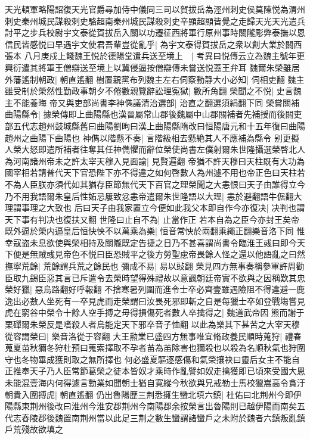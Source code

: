天光頓軍略陽詔復天光官爵尋加侍中儀同三司以賀拔岳為涇州刺史侯莫陳悦為渭州刺史秦州城民謀殺刺史駱超南秦州城民謀殺刺史辛顯超顯皆覺之走歸天光天光遣兵討平之步兵校尉宇文泰從賀拔岳入關以功遷征西將軍行原州事時關隴彫弊泰撫以恩信民皆感悦曰早遇宇文使君吾輩豈從亂乎|{
	為宇文泰得賀拔岳之衆以創大業於關西張本}
八月庚戍上餞魏王悦於德陽堂遣兵送至境上　|{
	考異曰悦傳云立為魏主號年更興衍遣其將軍王僧辯送至境上以冀侵逼按僧辯傳未嘗送悦蓋王弁耳}
魏爾朱榮雖居外藩遙制朝政|{
	朝直遙翻}
樹置親黨布列魏主左右伺察動静大小必知|{
	伺相吏翻}
魏主雖受制於榮然性勤政事朝夕不倦數親覽辭訟理寃獄|{
	數所角翻}
榮聞之不悦|{
	史言魏主不能養晦}
帝又與吏部尚書李神儁議清治選部|{
	治直之翻選須絹翻下同}
榮嘗關補曲陽縣令|{
	據榮傳即上曲陽縣也漢晉屬常山郡後魏屬中山郡關補者先補授而後關吏部五代志趙州鼓城縣舊曰曲陽劉昫曰漢上曲陽縣隋改曰恒陽唐元和十五年復曰曲陽趙州之曲陽下曲陽也}
神儁以階懸不奏|{
	言階級相去懸絶其人不應補為縣令}
别更擬人榮大怒即遣所補者往奪其任神儁懼而辭位榮使尚書左僕射爾朱世隆攝選榮啓北人為河南諸州帝未之許太宰天穆入見面諭|{
	見賢遍翻}
帝猶不許天穆曰天柱既有大功為國宰相若請普代天下官恐陛下亦不得違之如何啓數人為州遽不用也帝正色曰天柱若不為人臣朕亦須代如其猶存臣節無代天下百官之理榮聞之大恚恨曰天子由誰得立今乃不用我語爾朱皇后性妬忌屢致忿恚帝遣爾朱世隆語以大理|{
	恚於避翻語牛倨翻大理謂事理之大致也}
后曰天子由我家置立今便如此我父本即自作今亦復决|{
	决判也謂天下事有判决也復扶又翻}
世隆曰止自不為|{
	止當作正}
若本自為之臣今亦封王矣帝既外逼於榮内逼皇后恒快怏不以萬乘為樂|{
	恒音常怏於兩翻乘繩正翻樂音洛下同}
惟幸寇盗未息欲使與榮相持及關隴既定告捷之日乃不甚喜謂尚書令臨淮王彧曰即今天下便是無賊彧見帝色不悦曰臣恐賊平之後方勞聖慮帝畏餘人怪之還以他語亂之曰然撫寧荒餘|{
	荒餘謂兵荒之餘民也}
彌成不易|{
	易以䜴翻}
榮見四方無事奏稱參軍許周勸臣取九錫臣惡其言已斥遣令去榮時望得殊禮故以意諷朝廷帝實不欲與之因稱歎其忠榮好獵|{
	惡烏路翻好呼報翻}
不捨寒暑列圍而進令士卒必齊壹雖遇險阻不得違避一鹿逸出必數人坐死有一卒見虎而走榮謂曰汝畏死邪即斬之自是每獵士卒如登戰塲嘗見虎在窮谷中榮令十餘人空手搏之毋得損傷死者數人卒擒得之|{
	魏道武帝因熊而謝于栗磾爾朱榮反是嗜殺人者烏能定天下邪卒音子恤翻}
以此為樂其下甚苦之大宰天穆從容謂榮曰|{
	樂音洛從于容翻}
大王勲業已盛四方無事唯宜脩政養民順時蒐狩|{
	禮春蒐夏苗秋獮冬狩杜預曰蒐索擇取不孕者苖為苖除害也獮殺也以殺為名順秋氣也狩圍守也冬物畢成獲則取之無所擇也}
何必盛夏驅逐感傷和氣榮攘袂曰靈后女主不能自正推奉天子乃人臣常節葛榮之徒本皆奴才乘時作亂譬如奴走擒獲即已頃來受國大恩未能混壹海内何得遽言勳業如聞朝士猶自寛縱今秋欲與兄戒勒士馬校獵嵩高令貪汙朝貴入圍搏虎|{
	朝直遙翻}
仍出魯陽歷三荆悉擁生蠻北填六鎮|{
	杜佑曰北荆州今即伊陽縣東荆州後改曰淮州今淮安郡荆州今南陽郡余按榮言出魯陽則已越伊陽而南矣五代志舂陵郡後魏置南荆州當以此足三荆之數生蠻謂諸蠻戶之未附於魏者六鎮叛亂鎮戶荒殘故欲填之}
